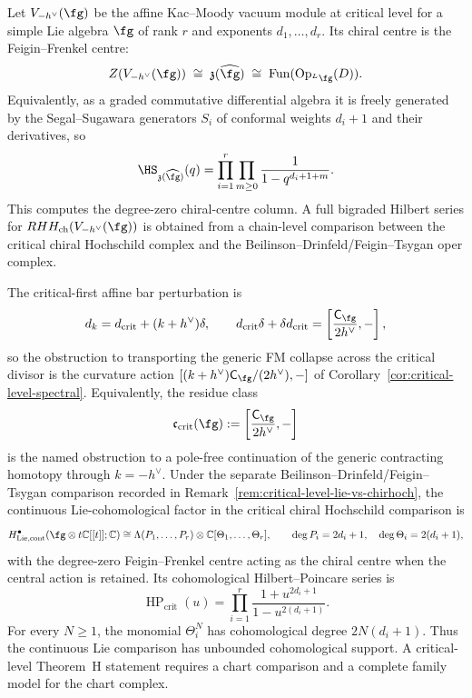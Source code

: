 \begin{theorem}
\label{thm:theorem-h-at-critical-level}
Let $V_{-h^\vee}(\fg)$ be the affine Kac--Moody vacuum module at
critical level for a simple Lie algebra $\fg$ of rank $r$ and
exponents $d_1,\ldots,d_r$. Its chiral centre is the Feigin--Frenkel
centre:
\[
 Z(V_{-h^\vee}(\fg))
 \;\cong\;
 \mathfrak z(\widehat{\fg})
 \;\cong\;
 \mathrm{Fun}(\mathrm{Op}_{{}^L\fg}(D)).
\]
Equivalently, as a graded commutative differential algebra it is freely
generated by the Segal--Sugawara generators $S_i$ of conformal weights
$d_i+1$ and their derivatives, so
\begin{equation}
\label{eq:ff-center-hilbert}
 \HS_{\mathfrak z(\widehat{\fg})}(q)
 =
 \prod_{i=1}^{r}\prod_{m\geq0}
 \frac{1}{1-q^{d_i+1+m}}.
\end{equation}
This computes the degree-zero chiral-centre column. A full bigraded
Hilbert series for $RHH_{\mathrm{ch}}(V_{-h^\vee}(\fg))$ is obtained
from a chain-level comparison between the critical chiral Hochschild
complex and the Beilinson--Drinfeld/Feigin--Tsygan oper complex.

The critical-first affine bar perturbation is
\[
 d_k=d_{\mathrm{crit}}+(k+h^\vee)\delta,\qquad
 d_{\mathrm{crit}}\delta+\delta d_{\mathrm{crit}}
 =
 \left[\frac{\mathsf C_{\fg}}{2h^\vee},-\right],
\]
so the obstruction to transporting the generic FM collapse across the
critical divisor is the curvature action
$[(k+h^\vee)\mathsf C_{\fg}/(2h^\vee),-]$ of
Corollary~\ref{cor:critical-level-spectral}. Equivalently, the residue
class
\[
 \mathfrak c_{\mathrm{crit}}(\fg)
 :=
 \left[\frac{\mathsf C_{\fg}}{2h^\vee},-\right]
\]
is the named obstruction to a pole-free continuation of the generic
contracting homotopy through $k=-h^\vee$. Under the separate
Beilinson--Drinfeld/Feigin--Tsygan comparison recorded in
Remark~\ref{rem:critical-level-lie-vs-chirhoch}, the continuous
Lie-cohomological factor in the critical chiral Hochschild comparison is
\[
 H^\bullet_{\mathrm{Lie,cont}}(\fg\otimes t\mathbb C[[t]];\mathbb C)
 \cong
 \Lambda(P_1,\ldots,P_r)\otimes
 \mathbb C[\Theta_1,\ldots,\Theta_r],
 \qquad
 \deg P_i=2d_i+1,\quad
 \deg\Theta_i=2(d_i+1),
\]
with the degree-zero Feigin--Frenkel centre acting as the chiral centre
when the central action is retained. Its cohomological Hilbert--Poincare
series is
\[
 \operatorname{HP}_{\mathrm{crit}}(u)
 =
 \prod_{i=1}^{r}
 \frac{1+u^{2d_i+1}}{1-u^{2(d_i+1)}}.
\]
For every $N\geq1$, the monomial $\Theta_i^N$ has cohomological degree
$2N(d_i+1)$. Thus the continuous Lie comparison has unbounded
cohomological support.  A critical-level Theorem~H statement requires
a chart comparison and a complete family model for the chart complex.
\end{theorem}

